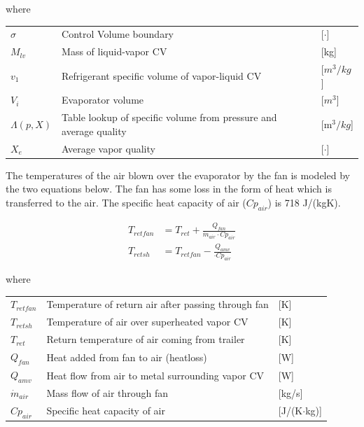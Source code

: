 where

\begin{center}
	\begin{tabular}{l p{10cm} l}
		$\sigma$       & Control Volume boundary                                           & [$\cdot$]            \\
		$M_{lv}$       & Mass of liquid-vapor CV                                           & [\si{kg}]            \\
		$v_1$          & Refrigerant specific volume of vapor-liquid CV                    & [$\si{m}^3/\si{kg}$] \\
		$V_i$          & Evaporator volume                                                 & [$\si{m}^3$]         \\
		$\Lambda(p,X)$ & Table lookup of specific volume from pressure and average quality & [\si{m}$^3/\si{kg}$] \\
		$ X_e $        & Average vapor quality                                             & [$\cdot$]
	\end{tabular}
\end{center}

The temperatures of the air blown over the evaporator by the fan is modeled by the two equations below. The fan has some loss in the form of heat which is transferred to the air. The specific heat capacity of air ($Cp_{air}$) is 718 \si{J}/(\si{kg}\si{K}).

\begin{align}
	T_{retfan} 		& = T_{ret} + \frac{Q_{fan}}{\dot{m}_{air} \cdot Cp_{air}} 		\label{eq:T_retfan} 		\\
	T_{retsh} 		& = T_{retfan} - \frac{Q_{amv}}{ \cdot Cp_{air}} 	\label{eq:T_retsh}
\end{align}

where

\begin{center}
	\begin{tabular}{l p{10cm} l}
		$T_{retfan}$    & Temperature of return air after passing through fan & [\si{K}]                          \\
		$T_{retsh}$     & Temperature of air over superheated vapor CV        & [\si{K}]                          \\
		$T_{ret}$       & Return temperature of air coming from trailer       & [\si{K}]                          \\
		$Q_{fan}$       & Heat added from fan to air (heatloss)               & [\si{W}]                          \\
		$Q_{amv}$       & Heat flow from air to metal surrounding vapor CV    & [\si{W}]                          \\
		$\dot{m}_{air}$ & Mass flow of air through fan                        & [\si{kg}/\si{s}]                  \\
		$Cp_{air}$      & Specific heat capacity of air                       & [\si{J}/(\si{K}$ \cdot $\si{kg})]
	\end{tabular}
\end{center}

